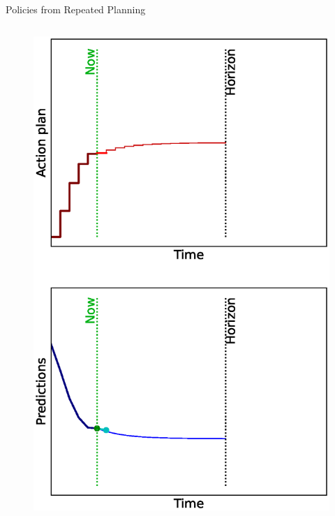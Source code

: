\documentclass[lecture]{beamer}
\begin{document}
\begin{frame}{\normalsize Policies from Repeated Planning}
\begin{columns}
\begin{overlayarea}{\textwidth}{0.9\textheight}
\begin{figure}
{         \includegraphics[width=\FS\textwidth,clip]{Codes/MPC/MPC5.eps}
        }%
        {%
}
\end{figure}
\end{overlayarea}
\end{columns}
\end{frame}
\end{document}
